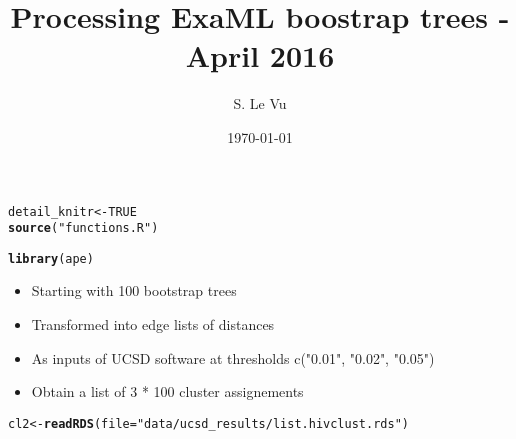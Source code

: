 \documentclass[]{revtex4}\usepackage[]{graphicx}\usepackage[]{color}
\makeatletter
\newcommand{\hlnum}[1]{\textcolor[rgb]{0.686,0.059,0.569}{#1}}%
\newcommand{\hlstr}[1]{\textcolor[rgb]{0.192,0.494,0.8}{#1}}%
\newcommand{\hlstd}[1]{\textcolor[rgb]{0.345,0.345,0.345}{#1}}%
\newcommand{\hlkwb}[1]{\textcolor[rgb]{0.69,0.353,0.396}{#1}}%
\newcommand{\hlkwc}[1]{\textcolor[rgb]{0.333,0.667,0.333}{#1}}%
\newcommand{\hlkwd}[1]{\textcolor[rgb]{0.737,0.353,0.396}{\textbf{#1}}}%
\newenvironment{kframe}{%
 \def\at@end@of@kframe{}%
 \ifinner\ifhmode%
  \def\at@end@of@kframe{\end{minipage}}%
  \begin{minipage}{\columnwidth}%
 \fi\fi%
 \def\FrameCommand##1{\hskip\@totalleftmargin \hskip-\fboxsep
 \colorbox{shadecolor}{##1}\hskip-\fboxsep
     \hskip-\linewidth \hskip-\@totalleftmargin \hskip\columnwidth}%
 \MakeFramed {\advance\hsize-\width
   \@totalleftmargin\z@ \linewidth\hsize
   \@setminipage}}%
 {\par\unskip\endMakeFramed%
 \at@end@of@kframe}
\newenvironment{knitrout}{}{} %
\makeatother
\begin{document}
\title{Processing ExaML boostrap trees - April 2016}
\author{S. Le Vu}
\date{\today}

\maketitle






\begin{knitrout}
\color{fgcolor}\begin{kframe}
\begin{alltt}
\hlstd{detail_knitr} \hlkwb{<-} \hlnum{TRUE}
\hlkwd{source}\hlstd{(}\hlstr{"functions.R"}\hlstd{)}
\end{alltt}
\end{kframe}
\end{knitrout}

\begin{knitrout}
\color{fgcolor}\begin{kframe}
\begin{alltt}
\hlkwd{library}\hlstd{(ape)}
\end{alltt}


{\ttfamily\noindent\color{warningcolor}{Warning: package 'ape' was built under R version 3.2.3}}\end{kframe}
\end{knitrout}
\begin{itemize}
\item Starting with 100 bootstrap trees
\item Transformed into edge lists of distances
\item As inputs of UCSD software at thresholds c("0.01", "0.02", "0.05")
\item Obtain a list of 3 * 100 cluster assignements
\end{itemize}


\begin{knitrout}
\color{fgcolor}\begin{kframe}
\begin{alltt}
\hlstd{cl2} \hlkwb{<-} \hlkwd{readRDS}\hlstd{(} \hlkwc{file} \hlstd{=} \hlstr{"data/ucsd_results/list.hivclust.rds"} \hlstd{)}
\end{alltt}
\end{kframe}
\end{knitrout}
\end{document}
